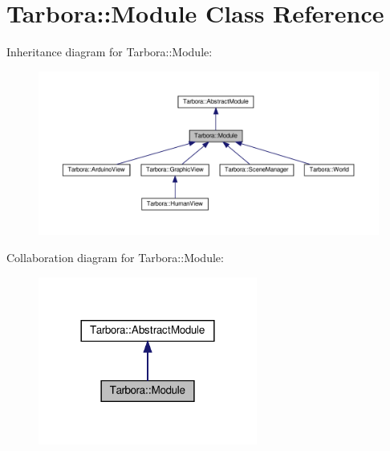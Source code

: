 \hypertarget{classTarbora_1_1Module}{}\section{Tarbora\+:\+:Module Class Reference}
\label{classTarbora_1_1Module}


Inheritance diagram for Tarbora\+:\+:Module\+:
\nopagebreak
\begin{figure}[H]
\begin{center}
\leavevmode
\includegraphics[width=350pt]{classTarbora_1_1Module__inherit__graph}
\end{center}
\end{figure}


Collaboration diagram for Tarbora\+:\+:Module\+:
\nopagebreak
\begin{figure}[H]
\begin{center}
\leavevmode
\includegraphics[width=204pt]{classTarbora_1_1Module__coll__graph}
\end{center}
\end{figure}
